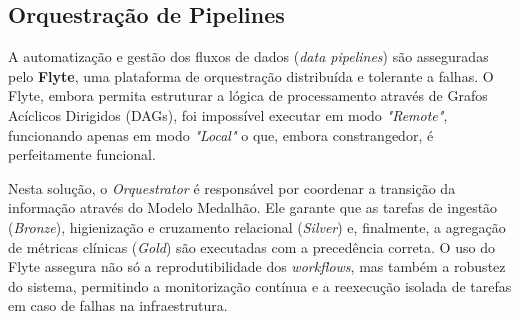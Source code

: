 \subsection{Orquestração de Pipelines} \label{subsec:orquestracao_pipelines}

A automatização e gestão dos fluxos de dados (\textit{data pipelines}) são asseguradas pelo \textbf{Flyte}, uma plataforma de orquestração distribuída e tolerante a falhas. O Flyte, embora permita estruturar a lógica de processamento através de Grafos Acíclicos Dirigidos (DAGs), foi impossível executar em modo \textit{"Remote"}, funcionando apenas em modo \textit{"Local"} o que, embora constrangedor, é perfeitamente funcional.

Nesta solução, o \textit{Orquestrator} é responsável por coordenar a transição da informação através do Modelo Medalhão. Ele garante que as tarefas de ingestão (\textit{Bronze}), higienização e cruzamento relacional (\textit{Silver}) e, finalmente, a agregação de métricas clínicas (\textit{Gold}) são executadas com a precedência correta. O uso do Flyte assegura não só a reprodutibilidade dos \textit{workflows}, mas também a robustez do sistema, permitindo a monitorização contínua e a reexecução isolada de tarefas em caso de falhas na infraestrutura.